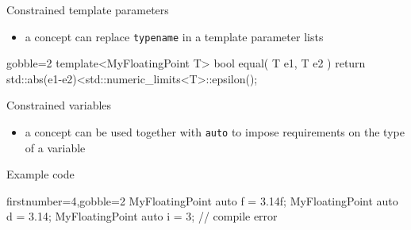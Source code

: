 \begin{frame}[fragile]
    \begin{block}{Constrained template parameters}
      \begin{itemize}
        \item a concept can replace \texttt{typename} in a template parameter lists
      \end{itemize}
    \end{block}
    \begin{exampleblock}{}
      \small
      \begin{cppcode*}{gobble=2}
      template<MyFloatingPoint T>
      bool equal( T e1, T e2 ) {
        return std::abs(e1-e2)<std::numeric_limits<T>::epsilon();
      }
      \end{cppcode*}
    \end{exampleblock}
    \begin{block}{Constrained variables}
      \begin{itemize}
        \item a concept can be used together with \texttt{auto} to impose requirements on the type of a variable
      \end{itemize}
    \end{block}
    \begin{exampleblock}{Example code}
      \begin{cppcode*}{firstnumber=4,gobble=2}
      MyFloatingPoint auto f = 3.14f;
      MyFloatingPoint auto d = 3.14;
      MyFloatingPoint auto i = 3; // compile error
      \end{cppcode*}
    \end{exampleblock}
\end{frame}


